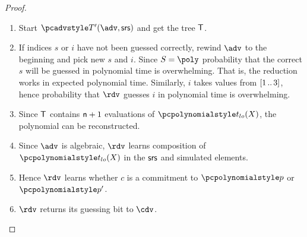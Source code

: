 \documentclass[runningheads,11pt]{llncs}
\begin{document}
\begin{proof}
\begin{enumerate}
    provides $\adv$ with a simulated proof such that instead of a simulated
    $\p{t_{lo}} (\chi)$  it gives $c'$.
  \item Start $\tdv'(\adv, \srs)$ and get the tree $\mathsf{T}$.
  \item If indices $s$ or $i$ have not been guessed correctly, rewind $\adv$ to
    the beginning and pick new $s$ and $i$. Since $S = \poly$ probability that
    the correct $s$ will be guessed in polynomial time is overwhelming. That is,
    the reduction works in expected polynomial time. Similarly, $i$ takes values
    from $[1 \, .. \, 3]$, hence probability that $\rdv$ guesses $i$ in polynomial
    time is overwhelming. 
  \item Since $\mathsf{T}$ contains $\mathsf{n} + 1$ evaluations of $\p{t_{lo}} (X)$, the
    polynomial can be reconstructed. 
  \item Since $\adv$ is algebraic, $\rdv$ learns composition of $\p{t_{lo}} (X)$ in
    the $\mathsf{srs}$ and simulated elements. 
  \item Hence $\rdv$ learns whether $c$ is a commitment to $\p{p}$ or $\p{p'}$.
  \item $\rdv$ returns its guessing bit to $\cdv$.
  \end{enumerate}
\end{proof}
\end{document}
